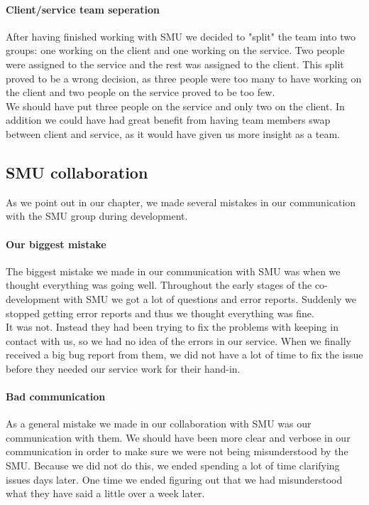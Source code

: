 \paragraph{Client/service team seperation} After having finished working with SMU we decided to "split" the team into two groups: one working on the client and one working on the service. Two people were assigned to the service and the rest was assigned to the client. This split proved to be a wrong decision, as three people were too many to have working on the client and two people on the service proved to be too few.
\\We should have put three people on the service and only two on the client. In addition we could have had great benefit from having team members swap between client and service, as it would have given us more insight as a team.

\subsection{SMU collaboration}
As we point out in our  chapter, we made several mistakes in our communication with the SMU group during development.

\paragraph{Our biggest mistake} The biggest mistake we made in our communication with SMU was when we thought everything was going well. Throughout the early stages of the co-development with SMU we got a lot of questions and error reports. Suddenly we stopped getting error reports and thus we thought everything was fine.
\\It was not. Instead they had been trying to fix the problems with keeping in contact with us, so we had no idea of the errors in our service. When we finally received a big bug report from them, we did not have a lot of time to fix the issue before they needed our service work for their hand-in.

\paragraph{Bad communication} As a general mistake we made in our collaboration with SMU was our communication with them. We should have been more clear and verbose in our communication in order to make sure we were not being misunderstood by the SMU. Because we did not do this, we ended spending a lot of time clarifying issues days later. One time we ended figuring out that we had misunderstood what they have said a little over a week later.

